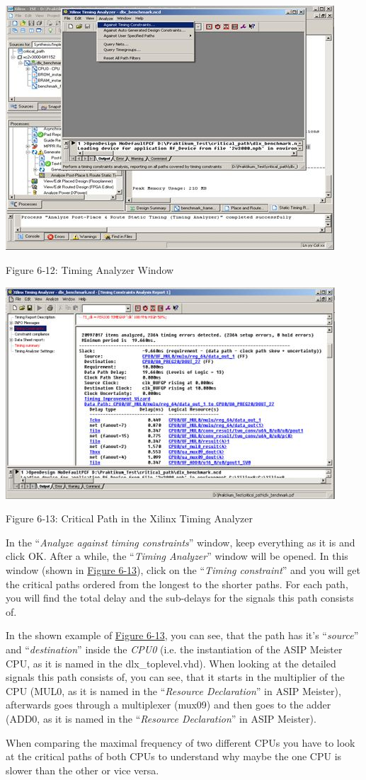 \documentclass[
]{article}
\begin{document}
\includegraphics[width=4.83156in,height=3.59861in]{6-12.png}

Figure 6‑12:\protect\hypertarget{Fig612}{}{} Timing Analyzer Window

\includegraphics[width=4.84665in,height=3.11458in]{6-13.png}

Figure 6‑13:\protect\hypertarget{Fig613}{}{} Critical Path in the Xilinx
Timing Analyzer

In the ``\emph{Analyze against timing constraints}'' window, keep
everything as it is and click OK. After a while, the ``\emph{Timing
Analyzer}'' window will be opened. In this window (shown in
\protect\hyperlink{Fig613}{Figure 6-13}), click on the ``\emph{Timing
constraint}'' and you will get the critical paths ordered from the
longest to the shorter paths. For each path, you will find the total
delay and the sub-delays for the signals this path consists of.

In the shown example of \protect\hyperlink{Fig613}{Figure 6-13}, you can
see, that the path has it's ``\emph{source}'' and ``\emph{destination}''
inside the \emph{CPU0} (i.e. the instantiation of the ASIP Meister CPU,
as it is named in the dlx\_toplevel.vhd). When looking at the detailed
signals this path consists of, you can see, that it starts in the
multiplier of the CPU (MUL0, as it is named in the ``\emph{Resource
Declaration}'' in ASIP Meister), afterwards goes through a multiplexer
(mux09) and then goes to the adder (ADD0, as it is named in the
``\emph{Resource Declaration}'' in ASIP Meister).

When comparing the maximal frequency of two different CPUs you have to
look at the critical paths of both CPUs to understand why maybe the one
CPU is slower than the other or vice versa.
\end{document}
